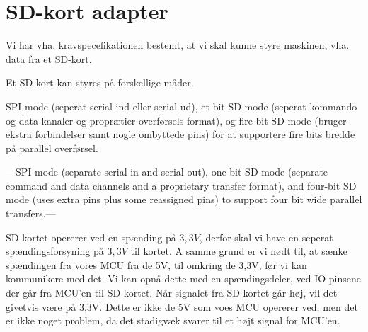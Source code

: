 


\section{SD-kort adapter}
Vi har vha. kravspecefikationen bestemt, at vi skal kunne styre
maskinen, vha. data fra et SD-kort.

Et SD-kort kan styres på forskellige måder. 

SPI mode (seperat serial ind eller serial ud), et-bit SD mode (seperat
kommando og data kanaler og proprætier overførsels format), og
fire-bit SD mode (bruger ekstra forbindelser samt nogle ombyttede
pins) for at supportere fire bits bredde på parallel overførsel.

---SPI mode (separate serial in and serial out), one-bit SD mode
(separate command and data channels and a proprietary transfer
format), and four-bit SD mode (uses extra pins plus some reassigned
pins) to support four bit wide parallel transfers.---


SD-kortet opererer ved en spænding på $3,3V$, derfor skal vi have en
seperat spændingsforsyning på $3,3V$ til kortet. A samme grund er vi
nødt til, at sænke spændingen fra vores MCU fra de 5V, til omkring de
3,3V, før vi kan kommunikere med det. Vi kan opnå dette med en
spændingsdeler, ved IO pinsene der går fra MCU'en til SD-kortet. Når
signalet fra SD-kortet går høj, vil det givetvis være på 3,3V. Dette
er ikke de 5V som voes MCU opererer ved, men det er ikke noget
problem, da det stadigvæk svarer til et højt signal for MCU'en.

